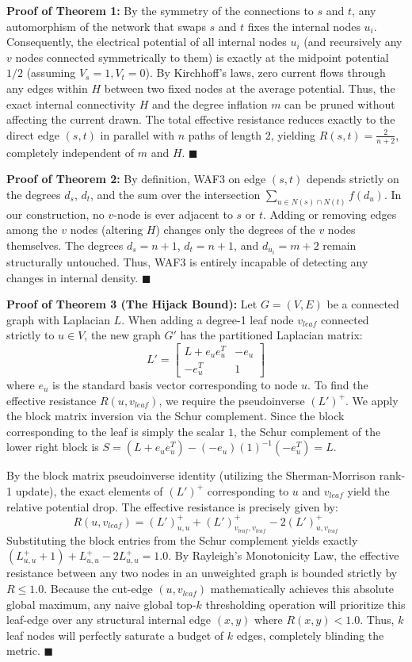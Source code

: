 \documentclass[10pt]{article} %
\begin{document}
\textbf{Proof of Theorem 1:} By the symmetry of the connections to $s$ and $t$, any automorphism of the network that swaps $s$ and $t$ fixes the internal nodes $u_i$. Consequently, the electrical potential of all internal nodes $u_i$ (and recursively any $v$ nodes connected symmetrically to them) is exactly at the midpoint potential $1/2$ (assuming $V_s=1, V_t=0$). By Kirchhoff's laws, zero current flows through any edges within $H$ between two fixed nodes at the average potential. Thus, the exact internal connectivity $H$ and the degree inflation $m$ can be pruned without affecting the current drawn. The total effective resistance reduces exactly to the direct edge $(s,t)$ in parallel with $n$ paths of length 2, yielding $R(s,t) = \frac{2}{n+2}$, completely independent of $m$ and $H$. $\blacksquare$

\textbf{Proof of Theorem 2:} By definition, WAF3 on edge $(s,t)$ depends strictly on the degrees $d_s$, $d_t$, and the sum over the intersection $\sum_{u \in N(s) \cap N(t)} f(d_u)$. In our construction, no $v$-node is ever adjacent to $s$ or $t$. Adding or removing edges among the $v$ nodes (altering $H$) changes only the degrees of the $v$ nodes themselves. The degrees $d_s = n+1$, $d_t = n+1$, and $d_{u_i} = m+2$ remain structurally untouched. Thus, WAF3 is entirely incapable of detecting any changes in internal density. $\blacksquare$

\textbf{Proof of Theorem 3 (The Hijack Bound):} Let $G = (V,E)$ be a connected graph with Laplacian $L$. When adding a degree-1 leaf node $v_{leaf}$ connected strictly to $u \in V$, the new graph $G'$ has the partitioned Laplacian matrix:
\[
L' = \begin{bmatrix}
L + e_u e_u^T & -e_u \\
-e_u^T & 1
\end{bmatrix}
\]
where $e_u$ is the standard basis vector corresponding to node $u$. To find the effective resistance $R(u, v_{leaf})$, we require the pseudoinverse $(L')^+$. We apply the block matrix inversion via the Schur complement. Since the block corresponding to the leaf is simply the scalar $1$, the Schur complement of the lower right block is $S = (L + e_u e_u^T) - (-e_u)(1)^{-1}(-e_u^T) = L$.

By the block matrix pseudoinverse identity (utilizing the Sherman-Morrison rank-1 update), the exact elements of $(L')^+$ corresponding to $u$ and $v_{leaf}$ yield the relative potential drop. The effective resistance is precisely given by:
\[
R(u, v_{leaf}) = (L')^+_{u,u} + (L')^+_{v_{leaf},v_{leaf}} - 2(L')^+_{u,v_{leaf}}
\]
Substituting the block entries from the Schur complement yields exactly $(L^+_{u,u} + 1) + L^+_{u,u} - 2L^+_{u,u} = 1.0$. By Rayleigh's Monotonicity Law, the effective resistance between any two nodes in an unweighted graph is bounded strictly by $R \le 1.0$. Because the cut-edge $(u, v_{leaf})$ mathematically achieves this absolute global maximum, any naive global top-$k$ thresholding operation will prioritize this leaf-edge over any structural internal edge $(x,y)$ where $R(x,y) < 1.0$. Thus, $k$ leaf nodes will perfectly saturate a budget of $k$ edges, completely blinding the metric. $\blacksquare$
\end{document}
